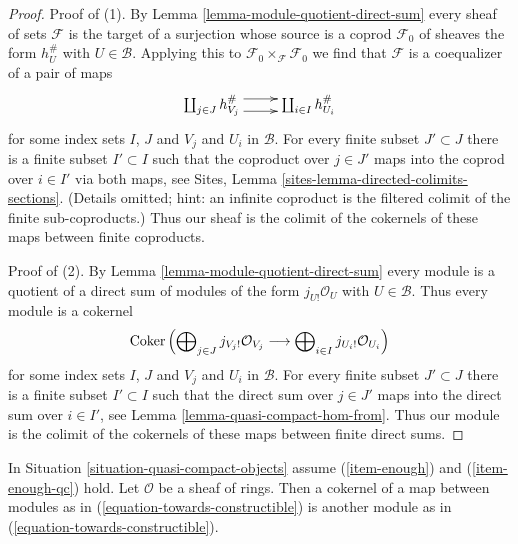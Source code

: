 \begin{proof}
Proof of (1). By Lemma \ref{lemma-module-quotient-direct-sum}
every sheaf of sets $\mathcal{F}$ is the target of a surjection
whose source is a coprod $\mathcal{F}_0$
of sheaves the form $h_{U}^\#$ with $U \in \mathcal{B}$.
Applying this to $\mathcal{F}_0 \times_\mathcal{F} \mathcal{F}_0$
we find that $\mathcal{F}$ is a coequalizer of a pair of maps
$$
\xymatrix{
\coprod\nolimits_{j \in J} h_{V_j}^\#
\ar@<1ex>[r] \ar@<-1ex>[r] &
\coprod\nolimits_{i \in I} h_{U_i}^\#
}
$$
for some index sets $I$, $J$ and $V_j$ and $U_i$ in $\mathcal{B}$.
For every finite subset $J' \subset J$ there is a finite subset
$I' \subset I$ such that the coproduct over $j \in J'$ maps into
the coprod over $i \in I'$ via both maps, see
Sites, Lemma \ref{sites-lemma-directed-colimits-sections}.
(Details omitted; hint: an infinite coproduct is the filtered colimit
of the finite sub-coproducts.)
Thus our sheaf is the colimit of the cokernels of these maps
between finite coproducts.

\medskip\noindent
Proof of (2).
By Lemma \ref{lemma-module-quotient-direct-sum}
every module is a quotient of a direct sum of modules of the form
$j_{U!}\mathcal{O}_U$ with $U \in \mathcal{B}$. Thus every module
is a cokernel
$$
\mathop{\mathrm{Coker}}\left(
\bigoplus\nolimits_{j \in J} j_{V_j!}\mathcal{O}_{V_j}
\longrightarrow
\bigoplus\nolimits_{i \in I} j_{U_i!}\mathcal{O}_{U_i}
\right)
$$
for some index sets $I$, $J$ and $V_j$ and $U_i$ in $\mathcal{B}$.
For every finite subset $J' \subset J$ there is a finite subset
$I' \subset I$ such that the direct sum over $j \in J'$ maps into
the direct sum over $i \in I'$, see
Lemma \ref{lemma-quasi-compact-hom-from}.
Thus our module is the colimit of the cokernels of these maps
between finite direct sums.
\end{proof}

\begin{lemma}
\label{lemma-cokernel-map-towards-constructibles}
In Situation \ref{situation-quasi-compact-objects} assume
(\ref{item-enough}) and (\ref{item-enough-qc}) hold.
Let $\mathcal{O}$ be a sheaf of rings.
Then a cokernel of a map between modules as in
(\ref{equation-towards-constructible}) is another module as
in (\ref{equation-towards-constructible}).
\end{lemma}

